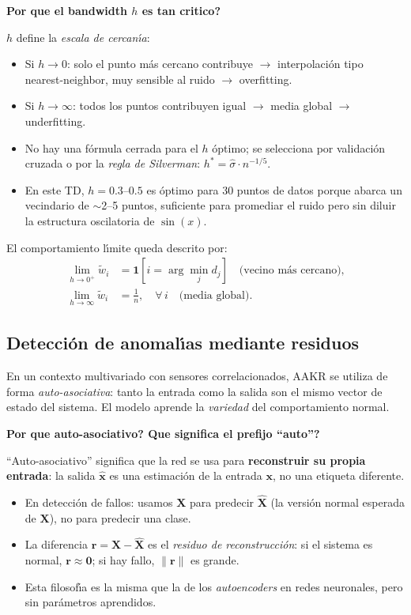 \documentclass[12pt,a4paper]{article}
\newcommand{\porque}[2]{%
  \vspace{8pt}%
  \begin{mdframed}[backgroundcolor=porqueFondo,
                   linecolor=porqueBorde,
                   linewidth=1.5pt,
                   leftmargin=0pt,
                   rightmargin=0pt,
                   innerleftmargin=10pt,
                   innerrightmargin=10pt,
                   innertopmargin=6pt,
                   innerbottommargin=6pt]
    {\color{porqueBorde}\bfseries\small Por que #1}\\[3pt]
    {\small #2}
  \end{mdframed}%
  \vspace{8pt}%
}
\begin{document}
\porque{el bandwidth $h$ es tan critico?}{%
$h$ define la \emph{escala de cercan\'{\i}a}:
\begin{itemize}[leftmargin=1.5em,noitemsep]
  \item Si $h \to 0$: solo el punto m\'as cercano contribuye $\to$ interpolaci\'on
        tipo nearest-neighbor, muy sensible al ruido $\to$ overfitting.
  \item Si $h \to \infty$: todos los puntos contribuyen igual $\to$ media global
        $\to$ underfitting.
  \item No hay una f\'ormula cerrada para el $h$ \'optimo; se selecciona por
        validaci\'on cruzada o por la \emph{regla de Silverman}:
        $h^* = \hat{\sigma} \cdot n^{-1/5}$.
  \item En este TD, $h = 0.3$--$0.5$ es \'optimo para 30 puntos de datos porque
        abarca un vecindario de $\sim$2--5 puntos, suficiente para promediar el
        ruido pero sin diluir la estructura oscilatoria de $\sin(x)$.
\end{itemize}}

El comportamiento l\'{\i}mite queda descrito por:
\begin{align}
  \lim_{h \to 0^+} \tilde{w}_i
    &= \mathbf{1}\!\left[i = \arg\min_j d_j\right]
     \quad \text{(vecino m\'as cercano),}\label{eq:lim_small}\\[4pt]
  \lim_{h \to \infty} \tilde{w}_i
    &= \tfrac{1}{n}, \quad \forall\,i
     \quad \text{(media global).}\label{eq:lim_large}
\end{align}

\subsection{Detecci\'on de anomal\'{\i}as mediante residuos}

En un contexto multivariado con sensores correlacionados, AAKR se utiliza de
forma \emph{auto-asociativa}: tanto la entrada como la salida son el mismo vector
de estado del sistema. El modelo aprende la \emph{variedad} del comportamiento
normal.

\porque{auto-asociativo? Que significa el prefijo ``auto''?}{%
``Auto-asociativo'' significa que la red se usa para \textbf{reconstruir su propia
entrada}: la salida $\hat{\mathbf{x}}$ es una estimaci\'on de la entrada
$\mathbf{x}$, no una etiqueta diferente.
\begin{itemize}[leftmargin=1.5em,noitemsep]
  \item En detecci\'on de fallos: usamos $\mathbf{X}$ para predecir
        $\hat{\mathbf{X}}$ (la versi\'on normal esperada de $\mathbf{X}$), no para
        predecir una clase.
  \item La diferencia $\mathbf{r} = \mathbf{X} - \hat{\mathbf{X}}$ es el
        \emph{residuo de reconstrucci\'on}: si el sistema es normal, $\mathbf{r}
        \approx \mathbf{0}$; si hay fallo, $\|\mathbf{r}\|$ es grande.
  \item Esta filosof\'{\i}a es la misma que la de los \emph{autoencoders} en redes
        neuronales, pero sin par\'ametros aprendidos.
\end{itemize}}
\end{document}
